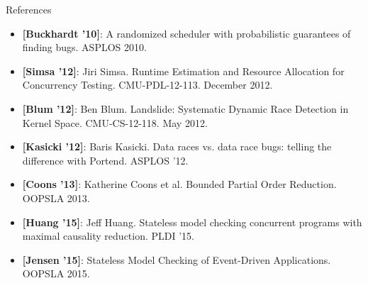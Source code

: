 \documentclass[xcolor=dvipsnames]{beamer}
\begin{document}
\begin{frame}{References}
	\footnotesize
	\begin{itemize}
		\item {\bf [Buckhardt '10]}: A randomized scheduler with probabilistic guarantees of finding bugs. ASPLOS 2010.
		\item {\bf [Simsa '12]}: Jiri Simsa. Runtime Estimation and Resource Allocation for
			Concurrency Testing. CMU-PDL-12-113. December 2012.
		\item {\bf [Blum '12]}: Ben Blum. Landslide: Systematic Dynamic Race Detection in Kernel
			Space. CMU-CS-12-118. May 2012.
		\item {\bf [Kasicki '12]}: Baris Kasicki. Data races vs. data race bugs: telling the difference with Portend. ASPLOS '12.
		\item {\bf [Coons '13]}: Katherine Coons et al. Bounded Partial Order Reduction. OOPSLA 2013.
		\item {\bf [Huang '15]}: Jeff Huang. Stateless model checking concurrent programs with maximal causality reduction. PLDI '15.
		\item {\bf [Jensen '15]}: Stateless Model Checking of Event-Driven Applications. OOPSLA 2015.
	\end{itemize}
\end{frame}
\end{document}
